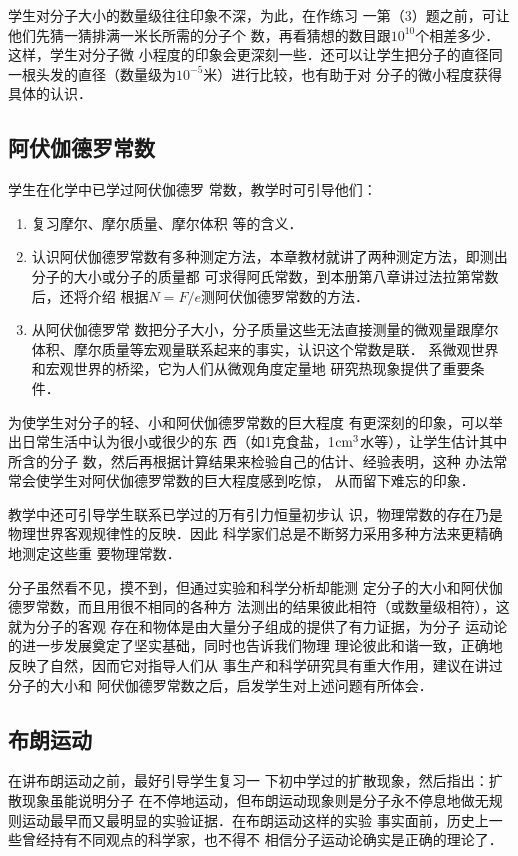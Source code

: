 学生对分子大小的数量级往往印象不深，为此，在作练习
一第（3）题之前，可让他们先猜一猜排满一米长所需的分子个
数，再看猜想的数目跟$10^{10}$个相差多少．这样，学生对分子微
小程度的印象会更深刻一些．还可以让学生把分子的直径同
一根头发的直径（数量级为$10^{-5}$米）进行比较，也有助于对
分子的微小程度获得具体的认识．

\subsection{阿伏伽德罗常数}
 学生在化学中已学过阿伏伽德罗
常数，教学时可引导他们：
\begin{enumerate}
\item 复习摩尔、摩尔质量、摩尔体积
等的含义．
\item 认识阿伏伽德罗常数有多种测定方法，本章教材就讲了两种测定方法，即测出分子的大小或分子的质量都
可求得阿氏常数，到本册第八章讲过法拉第常数后，还将介绍
根据$N=F/e$测阿伏伽德罗常数的方法．\item 从阿伏伽德罗常
数把分子大小，分子质量这些无法直接测量的微观量跟摩尔
体积、摩尔质量等宏观量联系起来的事实，认识这个常数是联．
系微观世界和宏观世界的桥梁，它为人们从微观角度定量地
研究热现象提供了重要条件．
\end{enumerate}

为使学生对分子的轻、小和阿伏伽德罗常数的巨大程度
有更深刻的印象，可以举出日常生活中认为很小或很少的东
西（如1克食盐，1${\rm cm}^3$水等），让学生估计其中所含的分子
数，然后再根据计算结果来检验自己的估计、经验表明，这种
办法常常会使学生对阿伏伽德罗常数的巨大程度感到吃惊，
从而留下难忘的印象．

教学中还可引导学生联系已学过的万有引力恒量初步认
识，物理常数的存在乃是物理世界客观规律性的反映．因此
科学家们总是不断努力采用多种方法来更精确地测定这些重
要物理常数．

分子虽然看不见，摸不到，但通过实验和科学分析却能测
定分子的大小和阿伏伽德罗常数，而且用很不相同的各种方
法测出的结果彼此相符（或数量级相符），这就为分子的客观
存在和物体是由大量分子组成的提供了有力证据，为分子
运动论的进一步发展奠定了坚实基础，同时也告诉我们物理
理论彼此和谐一致，正确地反映了自然，因而它对指导人们从
事生产和科学研究具有重大作用，建议在讲过分子的大小和
阿伏伽德罗常数之后，启发学生对上述问题有所体会．

\subsection{布朗运动}
 在讲布朗运动之前，最好引导学生复习一
下初中学过的扩散现象，然后指出：扩散现象虽能说明分子
在不停地运动，但布朗运动现象则是分子永不停息地做无规
则运动最早而又最明显的实验证据．在布朗运动这样的实验
事实面前，历史上一些曾经持有不同观点的科学家，也不得不
相信分子运动论确实是正确的理论了．

